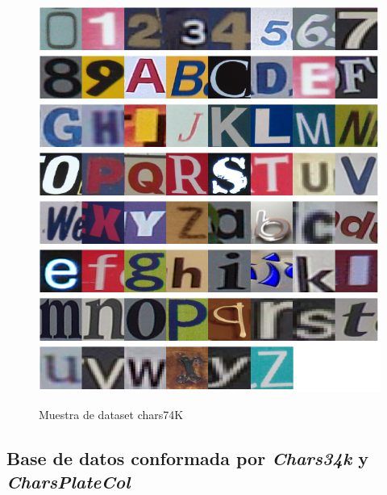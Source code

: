 \begin{figure}[H]
\begin{center}
   {\includegraphics[width=.37\linewidth]{charks74.png}}
    \caption{Muestra de dataset chars74K}
    \label{fig:Muestra de dataset chars74K} 
\end{center}
\end{figure}



\subsection{Base de datos conformada por \textit{Chars34k} y \textit{CharsPlateCol}} \label{Chars34k}

